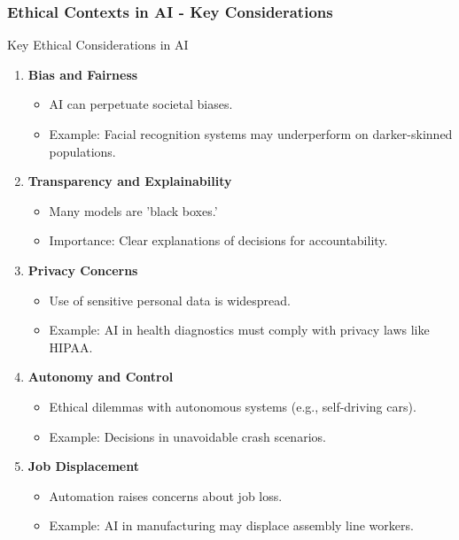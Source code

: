 \documentclass[aspectratio=169]{beamer}
\begin{document}
\begin{frame}[fragile]
    \frametitle{Ethical Contexts in AI - Key Considerations}
    \begin{block}{Key Ethical Considerations in AI}
        \begin{enumerate}
            \item \textbf{Bias and Fairness}
                \begin{itemize}
                    \item AI can perpetuate societal biases.
                    \item Example: Facial recognition systems may underperform on darker-skinned populations.
                \end{itemize}
                
            \item \textbf{Transparency and Explainability}
                \begin{itemize}
                    \item Many models are 'black boxes.'
                    \item Importance: Clear explanations of decisions for accountability.
                \end{itemize}
                
            \item \textbf{Privacy Concerns}
                \begin{itemize}
                    \item Use of sensitive personal data is widespread.
                    \item Example: AI in health diagnostics must comply with privacy laws like HIPAA.
                \end{itemize}
                
            \item \textbf{Autonomy and Control}
                \begin{itemize}
                    \item Ethical dilemmas with autonomous systems (e.g., self-driving cars).
                    \item Example: Decisions in unavoidable crash scenarios.
                \end{itemize}
                
            \item \textbf{Job Displacement}
                \begin{itemize}
                    \item Automation raises concerns about job loss.
                    \item Example: AI in manufacturing may displace assembly line workers.
                \end{itemize}
        \end{enumerate}
    \end{block}
\end{frame}
\end{document}
